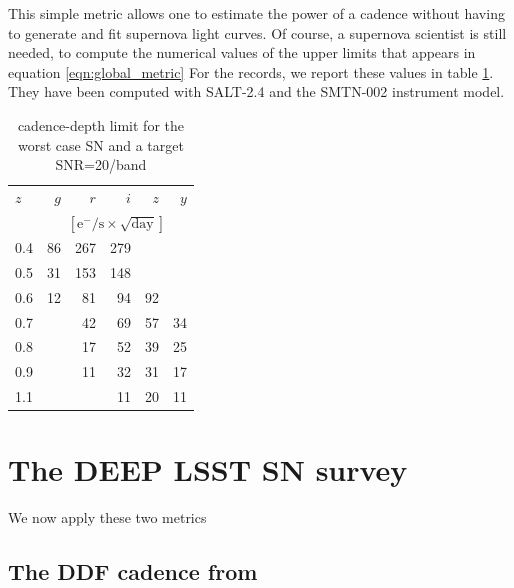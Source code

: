 \documentclass[\docopts]{\docclass}
\begin{document}
This simple metric allows one to estimate the power of a cadence
without having to generate and fit supernova light curves.  Of course,
a supernova scientist is still needed, to compute the numerical values
of the upper limits that appears in equation \ref{eqn:global_metric}
For the records, we report these values in table
\ref{tab:cadence_depth_limit}. They have been computed with SALT-2.4
and the SMTN-002 instrument model.



\begin{table}[t]
\begin{center}
\caption{cadence-depth limit for the worst case SN and a target SNR=20/band}
\label{tab:cadence_depth_limit}
\begin{tabular}{l|rrrrr}
\hline
\hline
    $z$   &      $g$         &       $r$         &     $i$           &      $z$        &      $y$           \\
          &      \multicolumn{5}{c}{$[\mathrm{e^-/s \times \sqrt{day}}]$} \\
\hline
     0.4  &      86 &     267 &     279 &         &           \\
     0.5  &      31 &     153 &     148 &         &           \\
     0.6  &      12 &      81 &      94 &      92 &           \\
     0.7  &         &      42 &      69 &      57 &      34   \\
     0.8  &         &      17 &      52 &      39 &      25   \\
     0.9  &         &      11 &      32 &      31 &      17   \\
     1.1  &         &         &      11 &      20 &      11   \\
\hline
\end{tabular}
\end{center}
\end{table}



\section{The DEEP LSST SN survey}

We now apply these two metrics 

\subsection{The DDF cadence from }
\label{sec:results}
\end{document}
